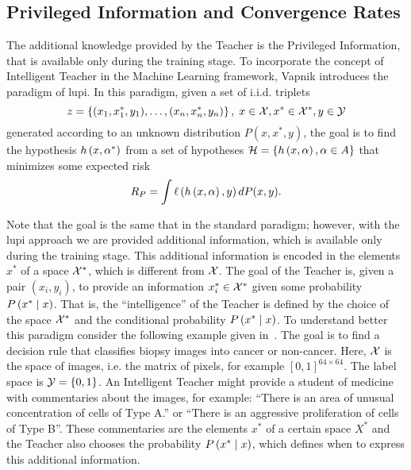 \subsection{Privileged Information and Convergence Rates}
The additional knowledge provided by the Teacher is the Privileged Information, that is available only during the training stage.
To incorporate the concept of Intelligent Teacher in the Machine Learning framework, Vapnik introduces the paradigm of \acrshort{lupi}.
In this paradigm, given a set of i.i.d. triplets
$$ z = \left\{(x_1, x^*_1, y_1), \ldots, (x_n,x^*_n, y_n)\right\}, \; x \in \mathcal{X}, x^* \in \mathcal{X}^*, y \in \mathcal{Y} $$
generated according to an unknown distribution $P(x, x^*, y)$, the goal is to find the hypothesis $h\left(x, \alpha^*\right)$ from a set of hypotheses $\mathcal{H} = \left\{h\left(x, \alpha\right), \alpha \in A\right\}$ that minimizes some expected risk 
$$ R_P = \int \ell\left( h\left(x, \alpha\right), y\right) dP(x, y). $$

Note that the goal is the same that in the standard paradigm; however, with the \acrshort{lupi} approach we are provided additional information, which is available only during the training stage. This additional information is encoded in the elements $x^*$ of a space $\mathcal{X}^*$, which is different from $\mathcal{X}$. The goal of the Teacher is, given a pair $(x_i, y_i)$, to provide an information $x_i^* \in \mathcal{X}^*$ given some probability $P\left( x^* \;\middle\vert\; x \right)$. That is, the ``intelligence'' of the Teacher is defined by the choice of the space $\mathcal{X}^*$ and the conditional probability $P\left( x^* \;\middle\vert\; x \right)$. 
To understand better this paradigm consider the following example given in~\cite{VapnikI15a}.
 The goal is to find a decision rule that classifies biopsy images into cancer or non-cancer. Here, $\mathcal{X}$ is the space of images, i.e. the matrix of pixels, for example $[0, 1]^{64 \times 64}$. The label space is $\mathcal{Y} = \left\{0, 1\right\}$. An Intelligent Teacher might provide a student of medicine with commentaries about the images, for example: ``There is an area of unusual concentration of cells of Type A.'' or ``There is an aggressive proliferation of cells of Type B''. These commentaries are the elements $x^*$ of a certain space $X^*$ and the Teacher also chooses the probability $P\left( x^* \;\middle\vert\; x \right)$, which defines when to express this additional information.

